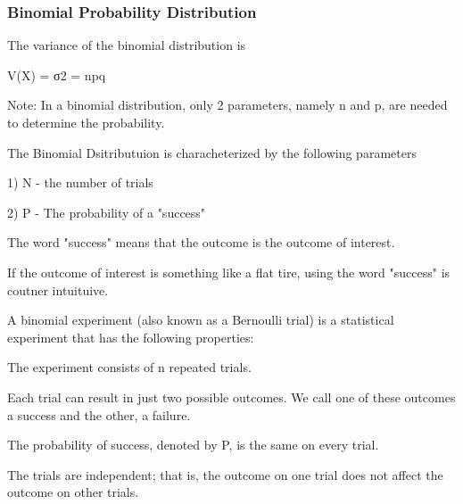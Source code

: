 \documentclass[IntroMain.tex]{subfiles}
\begin{document}
\begin{frame}
	\frametitle{Binomial Probability Distribution}
	\Large
	The variance of the binomial distribution is
	
	V(X) = σ2 = npq
	
	Note: In a binomial distribution, only 2 parameters, namely n and p, are needed to determine the probability.
	
	
	

\end{frame}	
\begin{frame}
	
	The Binomial Dsitributuion is characheterized by the following parameters
	
	
	
	1) N - the number of trials
	
	2) P - The probability of a "success"
	

\end{frame}	
\begin{frame}
	The word "success" means that the outcome is the outcome of interest.
	
	If the outcome of interest is something like a flat tire, using the word "success" is coutner intuituive.
	
	
	A binomial experiment (also known as a Bernoulli trial) is a statistical experiment that has the following properties:
	
	The experiment consists of n repeated trials.
	

\end{frame}	
\begin{frame}	
	Each trial can result in just two possible outcomes. We call one of these outcomes a success and the other, a failure.
	
	The probability of success, denoted by P, is the same on every trial.
	
	The trials are independent; that is, the outcome on one trial does not affect the outcome on other trials.
	
	


\end{frame}	
\end{document}
